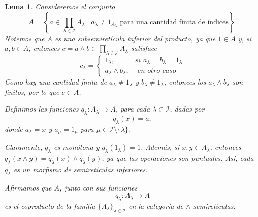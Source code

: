 \documentclass[12pt,letterpaper,titlepage]{article}
\newtheorem*{lemma}{Lema}
\theoremstyle{definition}
\renewcommand\inf{\wedge}
\newcommand\scr[1]{\mathscr{#1}}
\newcommand\<{\langle}
\renewcommand\>{\rangle}
\begin{document}
\begin{lemma}
    Consideremos el conjunto
    \[
    A=
    \left\{ a\in\prod_{\lambda\in\scr I} A_\lambda
    \mid a_\lambda\neq 1_{A_\lambda}
    \text{ para una cantidad finita de índices} \right\}.
    \]
    Notemos que $A$ es una subsemiretícula inferior del producto,
    ya que $1\in A$ y, si $a,b\in A$, entonces
    $c=a\inf b\in \prod_{\lambda\in\scr I} A_\lambda$
    satisface
    \[c_\lambda=
    \begin{cases}
        1_\lambda, & \textit{si }a_\lambda=b_\lambda=1_\lambda\\
        a_\lambda\wedge b_\lambda, & \textit{ en otro caso}
    \end{cases}
    \]
    Como hay una cantidad finita de
    $a_\lambda\neq 1_\lambda$ y $b_\lambda\neq 1_\lambda$,
    entonces los $a_\lambda\wedge b_\lambda$ son finitos,
    por lo que $c\in A$.
    
    Definimos las funciones
    $q_\lambda\colon A_\lambda\to A$,
    para cada $\lambda\in \scr I$, dadas por 
    \[q_\lambda(x)=a,\]
    donde $a_\lambda=x$ y $a_\mu =1_{\mu}$
    para $\mu\in \scr I\setminus \{\lambda\}$.
    
    Claramente, $q_\lambda$ es monótona y $q_\lambda(1_\lambda)=1$.
    Además, si $x,y\in A_\lambda$, entonces
    $q_\lambda(x\wedge y)=q_\lambda(x)\wedge q_\lambda(y)$,
    ya que las operaciones son puntuales.
    Así, cada $q_\lambda$ es un morfismo de semiretículas
    inferiores.
    
    Afirmamos que $A$, junto con sus funciones
    \[
        q_\lambda:A_\lambda\to A
    \]
    es el coproducto de la familia
    $\{A_\lambda\}_{\lambda\in\scr I}$
    en la categoría de $\inf$-semiretículas.
\end{lemma}
\end{document}
